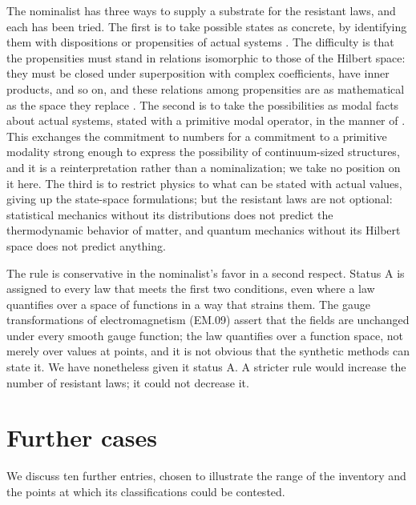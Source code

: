 \documentclass{situationist-preprint}
\begin{document}
The nominalist has three ways to supply a substrate for the resistant laws, and each has been tried. The first is to take possible states as concrete, by identifying them with dispositions or propensities of actual systems \citep{Balaguer1996}. The difficulty is that the propensities must stand in relations isomorphic to those of the Hilbert space: they must be closed under superposition with complex coefficients, have inner products, and so on, and these relations among propensities are as mathematical as the space they replace \citep{Bueno2003}. The second is to take the possibilities as modal facts about actual systems, stated with a primitive modal operator, in the manner of \citet{Hellman1989}. This exchanges the commitment to numbers for a commitment to a primitive modality strong enough to express the possibility of continuum-sized structures, and it is a reinterpretation rather than a nominalization; we take no position on it here. The third is to restrict physics to what can be stated with actual values, giving up the state-space formulations; but the resistant laws are not optional: statistical mechanics without its distributions does not predict the thermodynamic behavior of matter, and quantum mechanics without its Hilbert space does not predict anything.

The rule is conservative in the nominalist's favor in a second respect. Status A is assigned to every law that meets the first two conditions, even where a law quantifies over a space of functions in a way that strains them. The gauge transformations of electromagnetism (EM.09) assert that the fields are unchanged under every smooth gauge function; the law quantifies over a function space, not merely over values at points, and it is not obvious that the synthetic methods can state it. We have nonetheless given it status A. A stricter rule would increase the number of resistant laws; it could not decrease it.

\section{Further cases}\label{s:cases}

We discuss ten further entries, chosen to illustrate the range of the inventory and the points at which its classifications could be contested.
\end{document}
